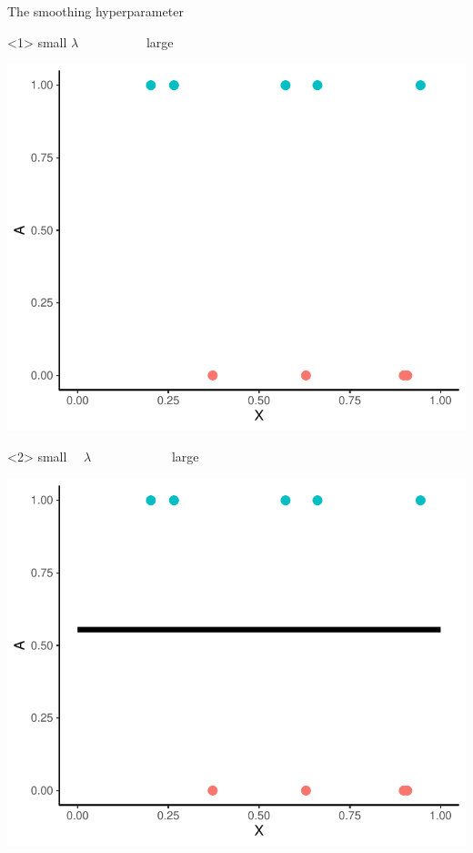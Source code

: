 \documentclass[smaller]{beamer}\usepackage{listings}
\begin{document}
\begin{frame}[label={sec:org87d521d}]{The smoothing hyperparameter}
\begin{onlyenv}<1>
\color{white}     \center small \(\lambda \quad \quad \quad \quad \quad\) large
\begin{center}
\includegraphics[width=.9\linewidth]{./hal-smoothing-dat.pdf}
\end{center}
\end{onlyenv}

\begin{onlyenv}<2>
\center small \(\quad \lambda \quad \quad \quad \quad \quad \quad\) large

\begin{center}
\includegraphics[width=.9\linewidth]{./hal-smoothing0.pdf}
\end{center}
\end{onlyenv}


\end{frame}
\end{document}
